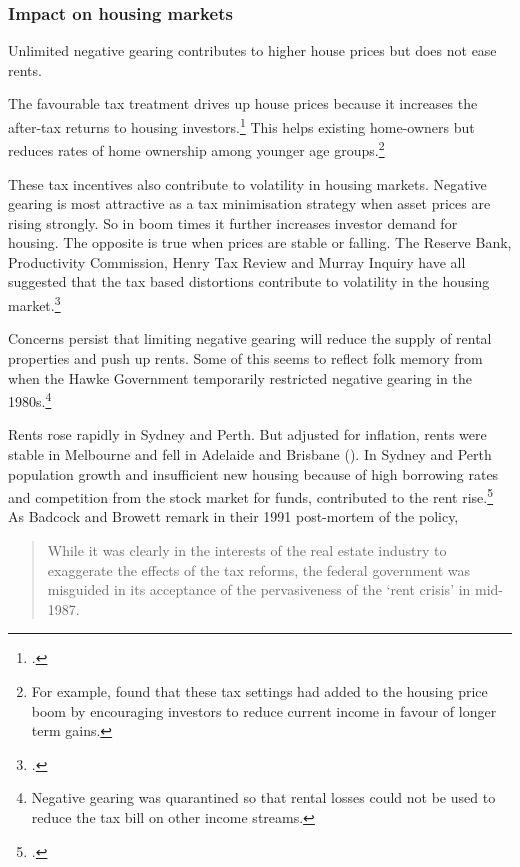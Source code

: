 \documentclass{grattan}\usepackage[]{graphicx}\usepackage[]{color}
\begin{document}
\subsubsection{Impact on housing markets}
Unlimited negative gearing contributes to higher house prices but does not ease rents. 

The favourable tax treatment drives up house prices because it increases the after-tax returns to housing investors.\footcite{RBA2015}   This helps existing home-owners but reduces rates of home ownership among younger age groups.\footnote{For example, \textcite{Commission2004} found that these tax settings had added to the housing price boom by encouraging investors to reduce current income in favour of longer term gains.}

These tax incentives also contribute to volatility in housing markets. Negative gearing is most attractive as a tax minimisation strategy when asset prices are rising strongly. So in boom times it further increases investor demand for housing. The opposite is true when prices are stable or falling. The Reserve Bank, Productivity Commission, Henry Tax Review and Murray Inquiry have all suggested that the tax based distortions contribute to volatility in the housing market.\footcites[p.45]{RBA2014}[p.75,131]{Commission2004}[p.70,418]{Treasury2010}[p.~278]{Inquiry2015}

Concerns persist that limiting negative gearing will reduce the supply of rental properties and push up rents. Some of this seems to reflect folk memory from when the Hawke Government temporarily restricted negative gearing in the 1980s.\footnote{Negative gearing was quarantined so that rental losses could not be used to reduce the tax bill on other income streams.}

Rents rose rapidly in Sydney and Perth. But adjusted for inflation, rents were stable in Melbourne and fell in Adelaide and Brisbane (). In Sydney and Perth population growth and insufficient new housing because of high borrowing rates and competition from the stock market for funds, contributed to the rent rise.\footcites[p.186]{badcock1991responsiveness}[pp.47-48]{Daley2013} As Badcock and Browett remark in their 1991 post-mortem of the policy, 

\begin{quote}
While it was clearly in the interests of the real estate industry to exaggerate the effects of the tax reforms, the federal government was misguided in its acceptance of the pervasiveness of the `rent crisis' in mid-1987.
\end{quote}
\end{document}
